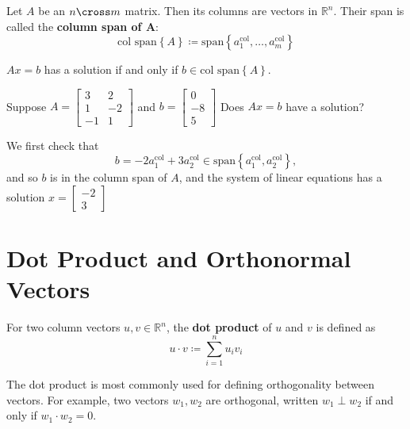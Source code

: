 \begin{definition}
	Let \(A\) be an \(n \cross m\) matrix. Then its columns are vectors in \(\mathbb{R} ^n\). Their span is called the \textbf{column span of A}:
	\[
		\text{col span} \left\{ A \right\} \coloneqq  \text{span} \left\{ a_1^\text{col}, \ldots, a_m^\text{col}\right\} 
	\]
	\begin{remark}
		\(Ax=b\) has a solution if and only if \(b \in \text{col span} \left\{ A \right\} \).
	\end{remark}
\end{definition}

\begin{problem}
	Suppose \(A = 
	\begin{bmatrix}
		3 & 2 \\
		1 & -2 \\
		-1 & 1
	\end{bmatrix}\)
	and \(b =
	\begin{bmatrix}
		0 \\ -8 \\ 5
	\end{bmatrix}\) 
	Does \(Ax=b\) have a solution?
\end{problem}
\begin{answer}
	We first check that
	\[
		b=-2a_1^{\text{col}}+3a_2^{\text{col}} \in \text{span} \left\{ a_1^{\text{col} }, a_2^{\text{col} } \right\}, 
	\]
	and so \(b\) is in the column span of \(A\), and the system of linear equations has a solution \(x = \begin{bmatrix}
		-2 \\ 3
	\end{bmatrix}\) 
\end{answer}

\section{Dot Product and Orthonormal Vectors}

\begin{definition}
	For two column vectors \(u, v \in \mathbb{R} ^n\), the \textbf{dot product} of \(u\) and \(v\) is defined as
	\[
		u \cdot v \coloneqq \sum_{i=1}^n u_i v_i
	\]
\end{definition}

The dot product is most commonly used for defining orthogonality between vectors. For example, two vectors \(w_1, w_2\) are orthogonal, written \(w_1 \perp w_2\) if and only if \(w_1 \cdot w_2 = 0\). \par

